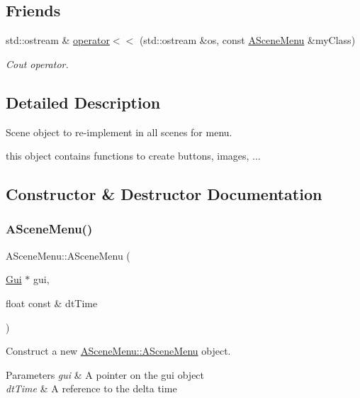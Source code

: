 \subsection*{Friends}
\begin{DoxyCompactItemize}
\item 
std\+::ostream \& \hyperlink{class_a_scene_menu_a402599a9f1ae99fd18976f6f3616fcc1}{operator$<$$<$} (std\+::ostream \&os, const \hyperlink{class_a_scene_menu}{A\+Scene\+Menu} \&my\+Class)
\begin{DoxyCompactList}\small\item\em Cout operator. \end{DoxyCompactList}\end{DoxyCompactItemize}


\subsection{Detailed Description}
Scene object to re-\/implement in all scenes for menu. 

this object contains functions to create buttons, images, ... 

\subsection{Constructor \& Destructor Documentation}
\mbox{\label{class_a_scene_menu_a97a8137c54f33e8f08adde2c2bb604c6}} 
\subsubsection{\texorpdfstring{A\+Scene\+Menu()}{ASceneMenu()}\hspace{0.1cm}{\footnotesize\ttfamily [1/2]}}
{\footnotesize\ttfamily A\+Scene\+Menu\+::\+A\+Scene\+Menu (\begin{DoxyParamCaption}\item[{\hyperlink{class_gui}{Gui} $\ast$}]{gui,  }\item[{float const \&}]{dt\+Time }\end{DoxyParamCaption})}



Construct a new \hyperlink{class_a_scene_menu_a97a8137c54f33e8f08adde2c2bb604c6}{A\+Scene\+Menu\+::\+A\+Scene\+Menu} object. 


\begin{DoxyParams}{Parameters}
{\em gui} & A pointer on the gui object \\
\hline
{\em dt\+Time} & A reference to the delta time \\
\hline
\end{DoxyParams}
\mbox{\label{class_a_scene_menu_a9962aa28c98e9471256c494563457f4b}} 
